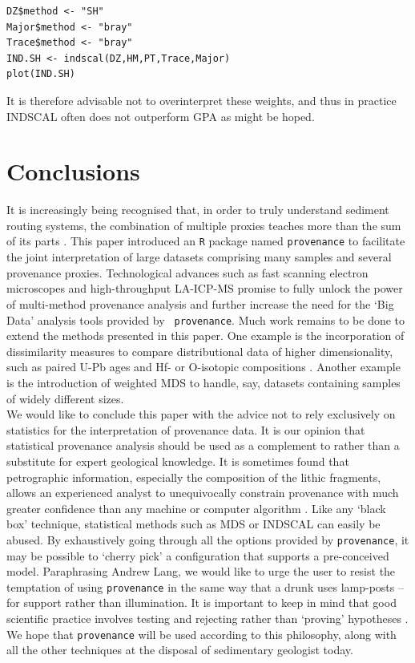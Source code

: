 \documentclass{article}
\begin{document}
\begin{verbatim}
DZ$method <- "SH"
Major$method <- "bray"
Trace$method <- "bray"
IND.SH <- indscal(DZ,HM,PT,Trace,Major)
plot(IND.SH) 
\end{verbatim}

It is therefore advisable not to overinterpret these weights, and thus
in practice INDSCAL often does not outperform GPA as might be hoped.

\section{Conclusions}
\label{sec:conclusions}

It is increasingly being recognised that, in order to truly understand
sediment routing systems, the combination of multiple proxies teaches
more than the sum of its parts \citep{garzanti2015}.  This paper
introduced an {\tt R} package named {\tt provenance} to facilitate the
joint interpretation of large datasets comprising many samples and
several provenance proxies. Technological advances such as fast
scanning electron microscopes \citep[e.g, QEMSCAN,][]{allen2012} and
high-throughput LA-ICP-MS \citep[e.g.,][]{frei2009} promise to fully
unlock the power of multi-method provenance analysis and further
increase the need for the `Big Data' analysis tools provided by {\tt
  provenance}.  Much work remains to be done to extend the methods
presented in this paper.  One example is the incorporation of
dissimilarity measures to compare distributional data of higher
dimensionality, such as paired U-Pb ages and Hf- or O-isotopic
compositions \citep[e.g.,][]{owen1987}.  Another example is the
introduction of weighted MDS \citep{deleeuw2009} to handle, say,
datasets containing samples of widely different sizes.\\

We would like to conclude this paper with the advice not to rely
exclusively on statistics for the interpretation of provenance
data. It is our opinion that statistical provenance analysis should be
used as a complement to rather than a substitute for expert geological
knowledge.  It is sometimes found that petrographic information,
especially the composition of the lithic fragments, allows an
experienced analyst to unequivocally constrain provenance with much
greater confidence than any machine or computer algorithm
\citep{garzanti2015}. Like any `black box' technique, statistical
methods such as MDS or INDSCAL can easily be abused.  By exhaustively
going through all the options provided by {\tt provenance}, it may be
possible to `cherry pick' a configuration that supports a
pre-conceived model.  Paraphrasing Andrew Lang, we would like to urge
the user to resist the temptation of using {\tt provenance} in the
same way that a drunk uses lamp-posts -- for support rather than
illumination.  It is important to keep in mind that good scientific
practice involves testing and rejecting rather than `proving'
hypotheses \citep{popper1959}.  We hope that {\tt provenance} will be
used according to this philosophy, along with all the other techniques
at the disposal of sedimentary geologist today.
\end{document}

